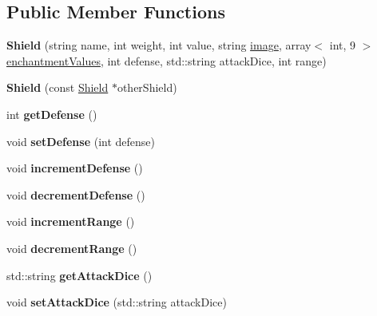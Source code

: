 \subsection*{Public Member Functions}
\begin{DoxyCompactItemize}
\item 
\hypertarget{class_shield_ae3dbea08547d4547faa441e5169605ba}{}\label{class_shield_ae3dbea08547d4547faa441e5169605ba} 
{\bfseries Shield} (string name, int weight, int value, string \hyperlink{class_item_add84a42b692ee5d580a92ae4a922f784}{image}, array$<$ int, 9 $>$ \hyperlink{class_item_a8532d8729f9433f41b7fc18b20d83236}{enchantment\+Values}, int defense, std\+::string attack\+Dice, int range)
\item 
\hypertarget{class_shield_a8c77767b623247b3ce1d42cbe3d3da05}{}\label{class_shield_a8c77767b623247b3ce1d42cbe3d3da05} 
{\bfseries Shield} (const \hyperlink{class_shield}{Shield} $\ast$other\+Shield)
\item 
\hypertarget{class_shield_a92fae272ca41b96a9f38770de4ed6180}{}\label{class_shield_a92fae272ca41b96a9f38770de4ed6180} 
int {\bfseries get\+Defense} ()
\item 
\hypertarget{class_shield_a3e421a1c80aae934300dadf6db390bf1}{}\label{class_shield_a3e421a1c80aae934300dadf6db390bf1} 
void {\bfseries set\+Defense} (int defense)
\item 
\hypertarget{class_shield_a4031510f895e4163ee2b447d7992e08b}{}\label{class_shield_a4031510f895e4163ee2b447d7992e08b} 
void {\bfseries increment\+Defense} ()
\item 
\hypertarget{class_shield_a90fe2bbca5c029c88715490c5525e1a6}{}\label{class_shield_a90fe2bbca5c029c88715490c5525e1a6} 
void {\bfseries decrement\+Defense} ()
\item 
\hypertarget{class_shield_a2e36b34d593ce4de9066c206c3528846}{}\label{class_shield_a2e36b34d593ce4de9066c206c3528846} 
void {\bfseries increment\+Range} ()
\item 
\hypertarget{class_shield_afeb7f31a542d80ededa37980f13df576}{}\label{class_shield_afeb7f31a542d80ededa37980f13df576} 
void {\bfseries decrement\+Range} ()
\item 
\hypertarget{class_shield_adca98dd6afb94104adbdadde591ae1e2}{}\label{class_shield_adca98dd6afb94104adbdadde591ae1e2} 
std\+::string {\bfseries get\+Attack\+Dice} ()
\item 
\hypertarget{class_shield_a69ddf60fb2bfe723051f535b8f1f5cd6}{}\label{class_shield_a69ddf60fb2bfe723051f535b8f1f5cd6} 
void {\bfseries set\+Attack\+Dice} (std\+::string attack\+Dice)

\end{DoxyCompactItemize}
